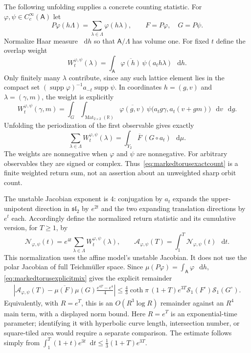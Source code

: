 \documentclass[11pt,a4paper]{article}
\numberwithin{equation}{section}
\theoremstyle{definition}
\theoremstyle{remark}
\newcommand{\dd}{\mathop{}\!\mathrm d}
\newcommand{\RR}{\mathbb R}
\begin{document}
The following unfolding supplies a concrete counting statistic.
For $\varphi,\psi\in C_c^\infty(\mathsf A)$ let
\[
 P\varphi(h\Lambda)=\sum_{\lambda\in\Lambda}\varphi(h\lambda),
 \qquad F=P\varphi,\quad G=P\psi.
\]
Normalize Haar measure $\dd h$ so that $\mathsf A/\Lambda$ has volume one.
For fixed $t$ define the overlap weight
\begin{equation}
 W_t^{\varphi,\psi}(\lambda)
 =\int_{\mathsf A}\overline{\varphi(h)}\,
                   \psi(a_th\lambda)\,\dd h.
 \label{eq:markedtorusweight}
\end{equation}
Only finitely many $\lambda$ contribute, since any such lattice
element lies in the compact set
$(\operatorname{supp}\varphi)^{-1}a_{-t}
\operatorname{supp}\psi$. In coordinates
$h=(g,v)$ and $\lambda=(\gamma,m)$, the weight is explicitly
\begin{equation}
 W_t^{\varphi,\psi}(\gamma,m)
 =\int_G\int_{\operatorname{Mat}_{2\times2}(\RR)}
    \overline{\varphi(g,v)}\,
    \psi\bigl(a_tg\gamma,a_t(v+gm)\bigr)\,\dd v\,\dd g.
 \label{eq:markedtorusweightcoordinates}
\end{equation}
Unfolding the periodization of the first observable gives exactly
\begin{equation}
 \sum_{\lambda\in\Lambda}W_t^{\varphi,\psi}(\lambda)
   =\int_{Y_2}\overline F\,(G\circ a_t)\,\dd\mu.
 \label{eq:markedtorusexactcount}
\end{equation}
The weights are nonnegative when $\varphi$ and $\psi$ are
nonnegative. For arbitrary observables they are signed or complex.
Thus~\eqref{eq:markedtorusexactcount} is a finite weighted return
sum, not an assertion about an unweighted sharp orbit count.

The unstable Jacobian exponent is $4$: conjugation by $a_t$
expands the upper-unipotent direction in $\mathfrak{sl}_2$ by
$e^{2t}$ and the two expanding translation directions by $e^t$
each. Accordingly define the normalized return statistic and its
cumulative version, for $T\geq1$, by
\[
 \mathcal N_{\varphi,\psi}(t)
   =e^{4t}\sum_{\lambda\in\Lambda}
                     W_t^{\varphi,\psi}(\lambda),\qquad
 \mathcal A_{\varphi,\psi}(T)
   =\int_1^T\mathcal N_{\varphi,\psi}(t)\,\dd t.
\]
This normalization uses the affine model's unstable Jacobian. It
does not use the polar Jacobian of full Teichm\"uller space.
Since $\mu(P\varphi)=\int_{\mathsf A}\varphi\,\dd h$,
\eqref{eq:markedtorusexplicitmix} gives the explicit remainder
\begin{equation}
 \begin{split}
 \left|\mathcal A_{\varphi,\psi}(T)
    -\overline{\mu(F)}\mu(G)\frac{e^{4T}-e^4}{4}\right|
 \leq\frac43\coth\pi\,(1+T)e^{3T}
       \mathcal S_1(F^\circ)\mathcal S_1(G^\circ).
 \end{split}
 \label{eq:markedtoruscountremainder}
\end{equation}
Equivalently, with $R=e^T$, this is an $O(R^3\log R)$
remainder against an $R^4$ main term, with a displayed norm bound.
Here $R=e^T$ is an exponential-time parameter; identifying it with
hyperbolic curve length, intersection number, or square-tiled area
would require a separate comparison. The estimate follows simply from
$\int_1^T(1+t)e^{3t}\dd t\leq\tfrac13(1+T)e^{3T}$.
\end{document}
